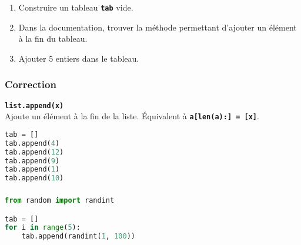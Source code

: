 \documentclass[svgnames,11pt]{beamer}
\begin{document}
\begin{frame}
    \frametitle{}

    \begin{activite}
    \begin{enumerate}
        \item Construire un tableau \textbf{\texttt{tab}} vide.
        \item Dans la documentation, trouver la méthode permettant d'ajouter un élément à la fin du tableau.
        \item Ajouter 5 entiers dans le tableau.
    \end{enumerate}
    \end{activite}

\end{frame}
\begin{frame}[fragile]
    \frametitle{Correction}
    \begin{framed}
        \texttt{\textbf{list.append(x)}}\\
        Ajoute un élément à la fin de la liste. Équivalent à \texttt{\textbf{a[len(a):] = [x]}}.
    \end{framed}

\begin{lstlisting}[language=Python , basicstyle=\ttfamily\small, xleftmargin=2em, xrightmargin=2em]
tab = []
tab.append(4)
tab.append(12)
tab.append(9)
tab.append(1)
tab.append(10)
\end{lstlisting}

\end{frame}
\begin{frame}[fragile]
    \frametitle{}

    \begin{center}
\begin{lstlisting}[language=Python , basicstyle=\ttfamily\small, xleftmargin=2em, xrightmargin=2em]
from random import randint

tab = []
for i in range(5):
    tab.append(randint(1, 100))
\end{lstlisting}
\label{CODE}
\end{center}    

\end{frame}
\end{document}
